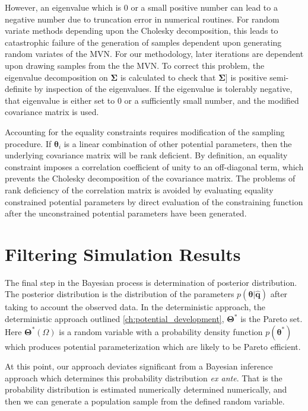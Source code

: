 However, an eigenvalue which is 0 or a small positive number can lead to a negative number due to truncation error in numerical routines.  For random variate methods depending upon the Cholesky decomposition, this leads to catastrophic failure of the generation of samples dependent upon generating random variates of the MVN.  For our methodology, later iterations are dependent upon drawing samples from the the MVN.  To correct this problem, the eigenvalue decomposition on $\bm{\Sigma}$ is calculated to check that $\bm{\Sigma]}$ is positive semi-definite by inspection of the eigenvalues.  If the eigenvalue is tolerably negative, that eigenvalue is either set to $0$ or a sufficiently small number, and the modified covariance matrix is used.

Accounting for the equality constraints requires modification of the sampling procedure.  If $\bm{\theta}_i$ is a linear combination of other potential parameters, then the underlying covariance matrix will be rank deficient.  By definition, an equality constraint imposes a correlation coefficient of unity to an off-diagonal term, which prevents the Cholesky decomposition of the covariance matrix.  The problems of rank deficiency of the correlation matrix is avoided by evaluating equality constrained potential parameters by direct evaluation of the constraining function after the unconstrained potential parameters have been generated.

\section{Filtering Simulation Results}
\label{sec:filtering}

The final step in the Bayesian process is determination of posterior distribution.  The posterior distribution is the distribution of the parameters $p(\bm{\theta}|\hat{\bm{q}})$ after taking to account the observed data.  In the deterministic approach, the deterministic approach outlined \ref{ch:potential_development}, $\bm{\Theta}^*$ is the Pareto set.  Here $\bm{\Theta}^*(\Omega)$ is a random variable with a probability density function $p(\bm{\theta}^*)$ which produces potential parameterization which are likely to be Pareto efficient.

At this point, our approach deviates significant from a Bayesian inference approach which determines this probability distribution \emph{ex ante}.  That is the probability distribution is estimated numerically determined numerically, and then we can generate a population sample from the defined random variable.

